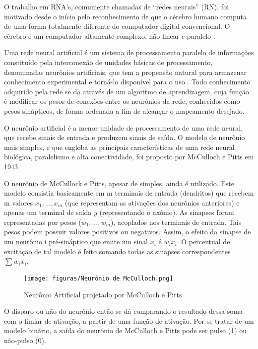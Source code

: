 O trabalho em RNA's, comumente chamadas de “redes neurais” (RN), foi motivado desde o início pelo reconhecimento de que o cérebro humano computa de uma forma totalmente diferente do computador digital convencional. O cérebro é um computador altamente complexo, não linear e paralelo \cite{haykin2009neural}.

Uma rede neural artificial é um sistema de processamento paralelo de informações constituído pela interconexão de unidades básicas de processamento, denominadas neurônios artificiais, que tem a propensão natural para armazenar conhecimento experimental e torná-lo disponível para o uso \cite{haykin2009neural}. Todo conhecimento adquirido pela rede se da através de um algoritmo de aprendizagem, cuja função é modificar os pesos de conexões entre os neurônios da rede, conhecidos como pesos sinápticos, de forma ordenada a fim de alcançar o mapeamento desejado.

O neurônio artificial é a menor unidade de processamento de uma rede neural, que recebe sinais de entrada e produzem sinais de saída. O modelo de neurônio mais simples, e que engloba as principais características de uma rede neural biológica, paralelismo e alta conectividade, foi proposto por McCulloch e Pitts em 1943 \cite{mcculloch1943logical}

O neurônio de McCullock e Pitts, apesar de simples, ainda é utilizado. Este modelo consistia basicamente em m terminais de entrada (dendritos) que recebem m valores \(x_1, \ldots ,x_m\) (que representam as ativações dos neurônios anteriores) e apenas um terminal de saída \(y\) (representando o axônio). As sinapses foram representadas por pesos (\(w_1, \ldots , w_m\)), acoplados nos terminais de entrada. Tais pesos podem possuir valores positivos ou negativos. Assim, o efeito da sinapse de um neurônio i pré-sináptico que emite um sinal \(x_i\) é \(w_{i}x_{i}\). O percentual de excitação de tal modelo é feito somando todas as sinapses correspondentes \(\sum w_{i}x_{i}\). 

\begin{figure}[ht]
\centering
\texttt{[image: figuras/Neurônio de McCulloch.png]}
\caption{Neurônio Artificial projetado por McCulloch e Pitts}
\label{figneuronioMcCulloch}
\end{figure}

O disparo ou não do neurônio então se dá comparando o resultado dessa soma com o limiar de ativação, a partir de uma função de ativação. Por se tratar de um modelo binário, a saída do neurônio de McCulloch e Pitts pode ser pulso (1) ou não-pulso (0).

